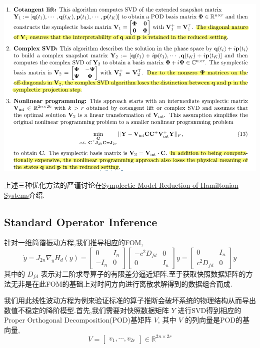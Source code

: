\documentclass[11pt]{article}
\begin{document}
\begin{center}
\includegraphics[width=.9\linewidth]{img/Background/2024-02-23_00-00-58_screenshot.png}
\end{center}

上述三种优化方法的严谨讨论在\href{PM2015SymplecticModelReduction.org}{Symplectic Model Reduction of Hamiltonian Systems}介绍.
\subsection{Standard Operator Inference}
\label{sec:orgeb006c4}
针对一维简谐振动方程,我们推导相应的FOM,
\begin{equation*}
\dot{y}=J_{2n}\nabla_yH_d(y)=\begin{bmatrix}0&I_n\\-I_n&0\end{bmatrix}\begin{bmatrix}-c^2D_{fd}&0\\0&I_n\end{bmatrix}y=\begin{bmatrix}0&I_n\\c^2D_{fd}&0\end{bmatrix}y
\end{equation*}
其中的 \(D_{fd}\) 表示对二阶求导算子的有限差分逼近矩阵.至于获取快照数据矩阵的方法无非是在此FOM的基础上对时间方向进行离散求解得到的数据组合而成.

我们用此线性波动方程为例来验证标准的算子推断会破坏系统的物理结构从而导出数值不稳定的降阶模型.首先,我们需要对快照数据矩阵 \(Y\) 进行SVD得到相应的Proper Orthogonal Decomposition(POD)基矩阵 \(V\), 其中 \(V\) 的列向量是POD的基向量,
\begin{equation*}
V=\begin{bmatrix}v_1,\cdots,v_{2r}\end{bmatrix}\in \mathbb{R}^{2n\times2r}
\end{equation*}
\end{document}
